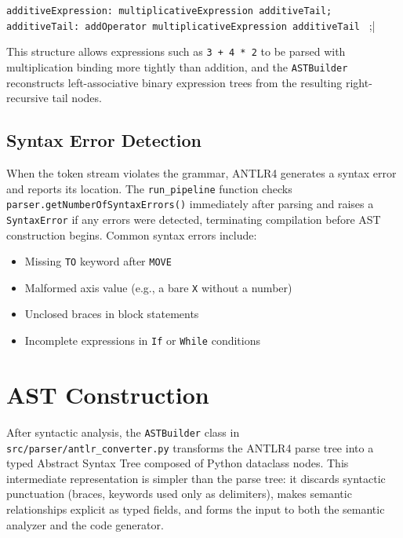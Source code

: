 \begin{center}
\verb|additiveExpression: multiplicativeExpression additiveTail;|\\
\verb|additiveTail: addOperator multiplicativeExpression additiveTail | ;|
\end{center}

This structure allows expressions such as \texttt{3 + 4 * 2} to be parsed with multiplication binding more tightly than addition, and the \texttt{ASTBuilder} reconstructs left-associative binary expression trees from the resulting right-recursive tail nodes.

\subsection*{Syntax Error Detection}

When the token stream violates the grammar, ANTLR4 generates a syntax error and reports its location. The \texttt{run\_pipeline} function checks \texttt{parser.getNumberOfSyntaxErrors()} immediately after parsing and raises a \texttt{SyntaxError} if any errors were detected, terminating compilation before AST construction begins. Common syntax errors include:

\begin{itemize}
    \item[-] Missing \texttt{TO} keyword after \texttt{MOVE}
    \item[-] Malformed axis value (e.g., a bare \texttt{X} without a number)
    \item[-] Unclosed braces in block statements
    \item[-] Incomplete expressions in \texttt{If} or \texttt{While} conditions
\end{itemize}

\section{AST Construction}

After syntactic analysis, the \texttt{ASTBuilder} class in \texttt{src/parser/antlr\_converter.py} transforms the ANTLR4 parse tree into a typed Abstract Syntax Tree composed of Python dataclass nodes. This intermediate representation is simpler than the parse tree: it discards syntactic punctuation (braces, keywords used only as delimiters), makes semantic relationships explicit as typed fields, and forms the input to both the semantic analyzer and the code generator.

